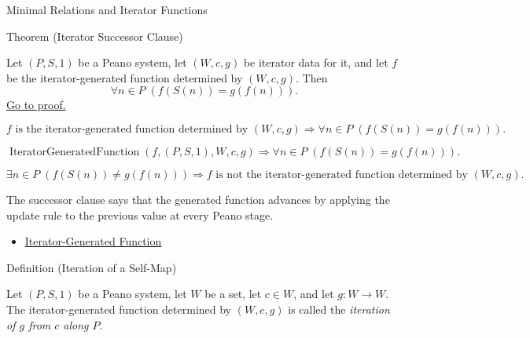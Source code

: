 \begin{topicbox}{Minimal Relations and Iterator Functions}
\begin{theorembox}{Theorem (Iterator Successor Clause)}
\begin{theorem}
\label{thm:iterator-successor-step}
Let $(P,S,1)$ be a Peano system, let $(W,c,g)$ be iterator data for it, and let
$f$ be the iterator-generated function determined by $(W,c,g)$. Then
\[
\forall n\in P\;(f(S(n))=g(f(n))).
\]
\hyperref[prf:iterator-successor-step]{Go to proof.}
\end{theorem}
\end{theorembox}

\begin{remark*}
\[
f \text{ is the iterator-generated function determined by } (W,c,g)
\Longrightarrow
\forall n\in P\;(f(S(n))=g(f(n))).
\]
\end{remark*}

\begin{remark*}
\[
\operatorname{IteratorGeneratedFunction}(f,(P,S,1),W,c,g)
\Longrightarrow
\forall n\in P\;(f(S(n))=g(f(n))).
\]
\end{remark*}

\begin{remark*}
\[
\exists n\in P\;(f(S(n))\neq g(f(n)))
\Longrightarrow
f \text{ is not the iterator-generated function determined by } (W,c,g).
\]
\end{remark*}

\begin{remark*}[Interpretation]
The successor clause says that the generated function advances by applying
the update rule to the previous value at every Peano stage.
\end{remark*}

\begin{dependencies}
\begin{itemize}
  \item \hyperref[def:iterator-generated-function]{Iterator-Generated Function}
\end{itemize}
\end{dependencies}

\begin{definitionbox}{Definition (Iteration of a Self-Map)}
\begin{definition}
\label{def:iteration-of-a-self-map}
Let $(P,S,1)$ be a Peano system, let $W$ be a set, let $c\in W$, and let
$g:W\to W$. The iterator-generated function determined by $(W,c,g)$ is called
the \emph{iteration of $g$ from $c$ along $P$}.
\end{definition}
\end{definitionbox}


\end{topicbox}
